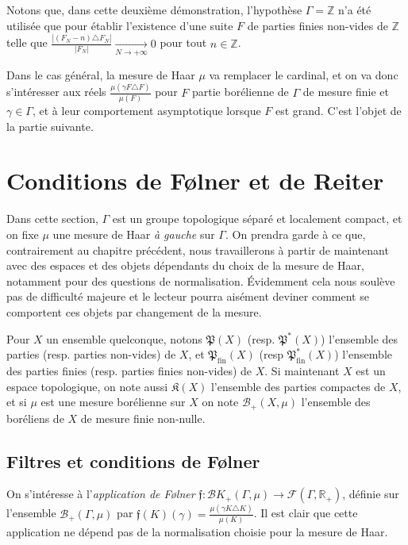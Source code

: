 \documentclass[a4paper,12pt]{article}
\newcommand{\R}{\mathbb{R}}
\newcommand{\Z}{\mathbb{Z}}
\newcommand{\Bor}{\mathcal{B}}
\newcommand{\abs}[1]{\left\vert#1\right\vert}
\newcommand{\card}[1]{\abs{#1}}
\newcommand{\parts}{\mathfrak{P}}
\newcommand{\finparts}{\mathfrak{P}_{\mathrm{fin}}}
\begin{document}
Notons que, dans cette deuxième démonstration, l'hypothèse $\Gamma=\Z$ n'a été utilisée que pour établir l'existence d'une suite $F$ 
de parties finies non-vides de $\Z$
telle que $\frac{\card{(F_N-n)\triangle F_N}}{\card{F_N}} \xrightarrow[N\to+\infty]{} 0$ pour tout $n\in\Z$. 

Dans le cas général, la mesure de Haar $\mu$ va remplacer le cardinal, et on va donc s'intéresser aux réels $\frac{\mu(\gamma F \triangle F)}{\mu(F)}$ 
pour $F$ partie borélienne de $\Gamma$ de mesure finie et $\gamma\in\Gamma$, et à leur comportement asymptotique
lorsque $F$ est grand. C'est l'objet de la partie suivante.

\section{Conditions de F\o{}lner et de Reiter}

Dans cette section, $\Gamma$ est un groupe topologique séparé et localement compact, et on fixe 
$\mu$ une mesure de Haar \emph{à gauche} sur $\Gamma$. On prendra garde à ce que, contrairement au chapitre précédent,
nous travaillerons à partir de maintenant avec des espaces et des objets dépendants du choix de la mesure de Haar,
notamment pour des questions de normalisation. Évidemment cela nous soulève pas de difficulté majeure et 
le lecteur pourra aisément deviner comment se comportent ces objets par changement de la mesure.

Pour $X$ un ensemble quelconque, notons $\parts(X)$ (resp. $\parts^*(X)$) l'ensemble des parties (resp. parties non-vides) de $X$, et $\finparts(X)$ (resp $\finparts^*(X)$) 
l'ensemble des parties finies (resp. parties finies non-vides) de $X$. Si maintenant $X$ est un espace topologique, 
on note aussi $\mathfrak{K}(X)$ l'ensemble des parties compactes de $X$, et si $\mu$ est une mesure borélienne sur 
$X$ on note $\Bor_+(X, \mu)$ l'ensemble des boréliens de $X$ de mesure finie non-nulle. 

\subsection{Filtres et conditions de F\o{}lner}

On s'intéresse à l'\emph{application de F\o{}lner} $\mathfrak{f} : \Bor{K}_+(\Gamma, \mu) \to \mathcal{F}(\Gamma, \R_+)$, définie sur l'ensemble 
$\Bor_+(\Gamma, \mu)$ par $\mathfrak{f}(K)(\gamma) = \frac{\mu(\gamma K \triangle K)}{\mu(K)}$.
Il est clair que cette application ne dépend pas de la normalisation choisie pour la mesure de Haar.
\end{document}
